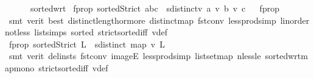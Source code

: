 \begin{isabellebody}
\ \ \ \ \ \ sorted{\isacharunderscore}{\kern0pt}wrt{}{\isacharparenright}{\kern0pt}%
\endisatagproof
{\isafoldproof}%
%
\isadelimproof
%
\endisadelimproof
\isanewline
{}\isamarkupfalse%
\ f{\isacharunderscore}{\kern0pt}prop{}{}{\isacharcolon}{\kern0pt}\ {\isachardoublequoteopen}sortedStrict\ {\isacharbrackleft}{\kern0pt}a{\isacharcomma}{\kern0pt}b{\isacharcomma}{\kern0pt}c{\isacharbrackright}{\kern0pt}\ {\isasymlongleftrightarrow}\ sdistinct{\isacharbrackleft}{\kern0pt}v{}\ a{\isacharcomma}{\kern0pt}\ v{}\ b{\isacharcomma}{\kern0pt}\ v{}\ c{\isacharbrackright}{\kern0pt}{\isachardoublequoteclose}%
\isadelimproof
\ %
\endisadelimproof
%
\isatagproof
{}\isamarkupfalse%
\ f{\isacharunderscore}{\kern0pt}prop{}\isanewline
\ \ \isamarkupfalse%
\ {\isacharparenleft}{\kern0pt}smt\ {\isacharparenleft}{\kern0pt}verit{\isacharcomma}{\kern0pt}\ best{\isacharparenright}{\kern0pt}\ distinct{\isacharunderscore}{\kern0pt}length{\isacharunderscore}{\kern0pt}{}{\isacharunderscore}{\kern0pt}or{\isacharunderscore}{\kern0pt}more\ distinct{\isacharunderscore}{\kern0pt}map\ fst{\isacharunderscore}{\kern0pt}conv\ less{\isacharunderscore}{\kern0pt}prod{\isacharunderscore}{\kern0pt}simp\ linorder{\isacharunderscore}{\kern0pt}not{\isacharunderscore}{\kern0pt}less\ list{\isachardot}{\kern0pt}simps{\isacharparenleft}{\kern0pt}{}{\isacharcomma}{\kern0pt}{}{\isacharparenright}{\kern0pt}\ sorted{}\ strict{\isacharunderscore}{\kern0pt}sorted{\isacharunderscore}{\kern0pt}iff\ v{}{\isacharunderscore}{\kern0pt}def{\isacharparenright}{\kern0pt}%
\endisatagproof
{\isafoldproof}%
%
\isadelimproof
%
\endisadelimproof
\isanewline
{}\isamarkupfalse%
\ f{\isacharunderscore}{\kern0pt}prop{}{}{\isacharcolon}{\kern0pt}\ {\isachardoublequoteopen}sortedStrict\ L\ {\isasymlongrightarrow}\ sdistinct\ {\isacharparenleft}{\kern0pt}map\ v{}\ L{\isacharparenright}{\kern0pt}{\isachardoublequoteclose}\ \isanewline
%
\isadelimproof
\ \ %
\endisadelimproof
%
\isatagproof
{}\isamarkupfalse%
\ {\isacharparenleft}{\kern0pt}smt\ {\isacharparenleft}{\kern0pt}verit{\isacharcomma}{\kern0pt}\ del{\isacharunderscore}{\kern0pt}insts{\isacharparenright}{\kern0pt}\ fst{\isacharunderscore}{\kern0pt}conv\ imageE\ less{\isacharunderscore}{\kern0pt}prod{\isacharunderscore}{\kern0pt}simp\ list{\isachardot}{\kern0pt}set{\isacharunderscore}{\kern0pt}map\ nless{\isacharunderscore}{\kern0pt}le\ sorted{\isacharunderscore}{\kern0pt}wrt{\isacharunderscore}{\kern0pt}map{\isacharunderscore}{\kern0pt}mono\ strict{\isacharunderscore}{\kern0pt}sorted{\isacharunderscore}{\kern0pt}iff\ v{}{\isacharunderscore}{\kern0pt}def{\isacharparenright}{\kern0pt}%

\end{isabellebody}
